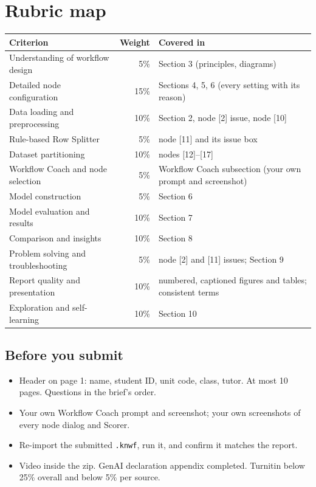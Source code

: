 \documentclass[11pt,a4paper]{article}
\newcommand{\cd}[1]{\texttt{#1}}                     %
\begin{document}
\section{Rubric map}\label{sec:rubric}
\begin{tabularx}{\linewidth}{@{}p{4.6cm}rL@{}}
\toprule Criterion & Weight & Covered in \\ \midrule
Understanding of workflow design & 5\% & Section 3 (principles, diagrams) \\
Detailed node configuration & 15\% & Sections 4, 5, 6 (every setting with its reason) \\
Data loading and preprocessing & 10\% & Section 2, node [2] issue, node [10] \\
Rule-based Row Splitter & 5\% & node [11] and its issue box \\
Dataset partitioning & 10\% & nodes [12]--[17] \\
Workflow Coach and node selection & 5\% & Workflow Coach subsection (your own prompt and screenshot) \\
Model construction & 5\% & Section 6 \\
Model evaluation and results & 10\% & Section 7 \\
Comparison and insights & 10\% & Section 8 \\
Problem solving and troubleshooting & 5\% & node [2] and [11] issues; Section 9 \\
Report quality and presentation & 10\% & numbered, captioned figures and tables; consistent terms \\
Exploration and self-learning & 10\% & Section 10 \\ \bottomrule
\end{tabularx}

\subsection*{Before you submit}
\begin{itemize}
  \item Header on page 1: name, student ID, unit code, class, tutor. At most 10 pages. Questions in the brief's order.
  \item Your own Workflow Coach prompt and screenshot; your own screenshots of every node dialog and Scorer.
  \item Re-import the submitted \cd{.knwf}, run it, and confirm it matches the report.
  \item Video inside the zip. GenAI declaration appendix completed. Turnitin below 25\% overall and below 5\% per source.
\end{itemize}
\end{document}
